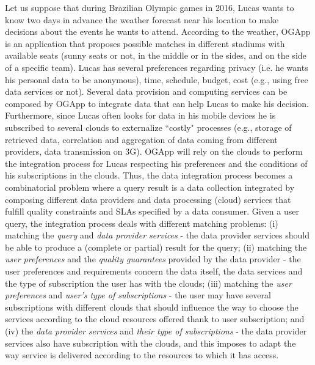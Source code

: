 Let us suppose that during Brazilian Olympic games in 2016, Lucas wants to know two days in advance the weather forecast near his  location to make decisions about the events he wants to attend. According to the weather, OGApp is an application that proposes possible matches  in different stadiums with available seats   (sunny seats or not, in the middle or in the sides, and on the side of a specific team).
%
 Lucas has several preferences regarding privacy  (i.e. he wants his personal data to be anonymous), time, schedule, budget, cost (e.g., using free data services or not). Several data provision and computing services  can be composed by OGApp to integrate data that can help Lucas to make his decision. Furthermore, since Lucas often looks for data in his mobile devices he is subscribed to several clouds to externalize ``costly"  processes (e.g., storage of retrieved data, correlation and aggregation of data coming from different providers, data transmission on 3G). 
%
OGApp will rely on the clouds to perform the integration process for Lucas respecting his preferences and the conditions of his subscriptions in the clouds. 
%
Thus, the data integration process becomes a combinatorial problem where a query result is a data collection integrated  by composing different data providers and data processing (cloud) services that fulfill quality constraints and SLAs specified by a data consumer.
Given a user query, the integration process deals with different matching problems: 
(i) matching the \textit{query} and \textit{data provider services} - the data provider services should be able to produce a (complete or partial) result for the query; 
(ii) matching the \textit{user preferences} and the \textit{quality guarantees} provided by the data provider - the user preferences and requirements concern the data itself, the data services and the type of subscription the user has with the clouds; 
(iii) matching the \textit{user preferences} and \textit{user's type of subscriptions} - the user may have several subscriptions with different clouds that should influence the way to choose the services according to the cloud resources offered thank to user subscription; and 
(iv) the \textit{data provider services} and \textit{their type of subscriptions} - the data provider services also have  subscription with the clouds, and this imposes to adapt the way service is delivered according to the resources to which it has access.

